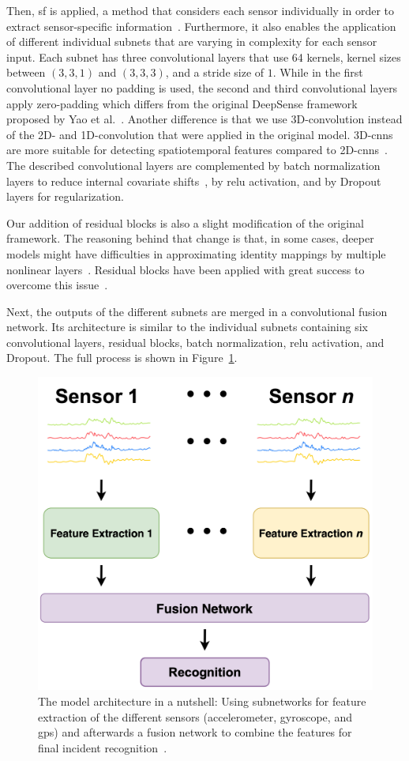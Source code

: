 Then, \ac{sf} is applied, a method that considers each sensor individually in order to extract sensor-specific information~\cite{elmenreich2002sensor}. 
Furthermore, it also enables the application of different individual subnets that are varying in complexity for each sensor input.
Each subnet has three convolutional layers that use 64 kernels, kernel sizes between $(3,3,1)$ and $(3,3,3)$, and a stride size of $1$.
While in the first convolutional layer no padding is used, the second and third convolutional layers apply zero-padding which differs from the original DeepSense framework proposed by Yao et al.~\cite{yao2017deepsense}. 
Another difference is that we use 3D-convolution instead of the 2D- and 1D-convolution that were applied in the original model. 
3D-\acp{cnn} are more suitable for detecting spatiotemporal features compared to 2D-\acp{cnn}~\cite{tran2015learning}. 
The described convolutional layers are complemented by batch normalization layers to reduce internal covariate shifts~\cite{ioffe2015batch}, by \ac{relu} activation, and by Dropout layers for regularization.

Our addition of residual blocks is also a slight modification of the original framework. 
The reasoning behind that change is that, in some cases, deeper models might have difficulties in approximating identity mappings by multiple nonlinear layers~\cite{he2016deep}. 
Residual blocks have been applied with great success to overcome this issue~\cite{he2016deep}.

Next, the outputs of the different subnets are merged in a convolutional fusion network. 
Its architecture is similar to the individual subnets containing six convolutional layers, residual blocks, batch normalization, \ac{relu} activation, and Dropout. 
The full process is shown in Figure~\ref{fig:sfn}.

\begin{figure}[t]
\centering
    \includegraphics[width=0.4\columnwidth]{fig/sensor-and-fusion-networks.png}
    \caption{The model architecture in a nutshell: Using subnetworks for feature extraction of the different sensors (accelerometer, gyroscope, and \ac{gps}) and afterwards a fusion network to combine the features for final incident recognition~\cite{chen2021deep}.}
    \label{fig:sfn}
\end{figure}

